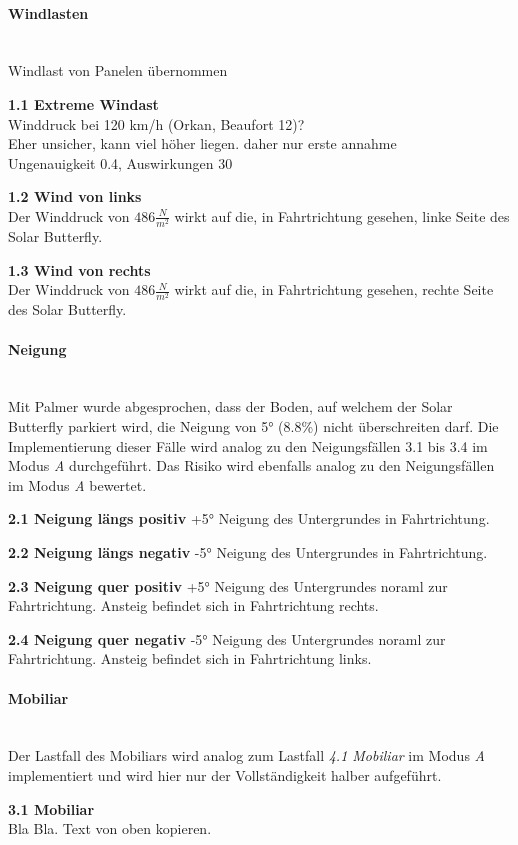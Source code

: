 \paragraph{Windlasten}\mbox{}\\
Windlast von Panelen übernommen
\begin{description}
  \item \textbf{1.1 Extreme Windast}\\
  Winddruck bei 120 km/h (Orkan, Beaufort 12)?\\
  Eher unsicher, kann viel höher liegen. daher nur erste annahme\\
  Ungenauigkeit 0.4, Auswirkungen 30
  \item \textbf{1.2 Wind von links}\\ Der Winddruck von $486 \frac{N}{m^2}$ wirkt auf die, in Fahrtrichtung gesehen, linke Seite des Solar Butterfly.
  \item \textbf{1.3 Wind von rechts}\\ Der Winddruck von $486 \frac{N}{m^2}$ wirkt auf die, in Fahrtrichtung gesehen, rechte Seite des Solar Butterfly.
\end{description}

\paragraph{Neigung}\mbox{}\\
Mit Palmer wurde abgesprochen, dass der Boden, auf welchem der Solar Butterfly parkiert wird, die Neigung von 5° (8.8\%) nicht überschreiten darf. Die Implementierung dieser Fälle wird analog zu den Neigungsfällen 3.1 bis 3.4 im Modus \emph{A} durchgeführt. Das Risiko wird ebenfalls analog zu den Neigungsfällen im Modus \emph{A} bewertet.
\begin{description}
  \item \textbf{2.1 Neigung längs positiv} +5° Neigung des Untergrundes in Fahrtrichtung.
  \item \textbf{2.2 Neigung längs negativ} -5° Neigung des Untergrundes in Fahrtrichtung.
  \item \textbf{2.3 Neigung quer positiv} +5° Neigung des Untergrundes noraml zur Fahrtrichtung. Ansteig befindet sich in Fahrtrichtung rechts.
  \item \textbf{2.4 Neigung quer negativ} -5° Neigung des Untergrundes noraml zur Fahrtrichtung. Ansteig befindet sich in Fahrtrichtung links.
\end{description}

\paragraph{Mobiliar}\mbox{}\\
Der Lastfall des Mobiliars wird analog zum Lastfall \emph{4.1 Mobiliar} im Modus \emph{A} implementiert und wird hier nur der Vollständigkeit halber aufgeführt.
\begin{description}
  \item \textbf{3.1 Mobiliar}\mbox{}\\
  Bla Bla. Text von oben kopieren.
\end{description}


